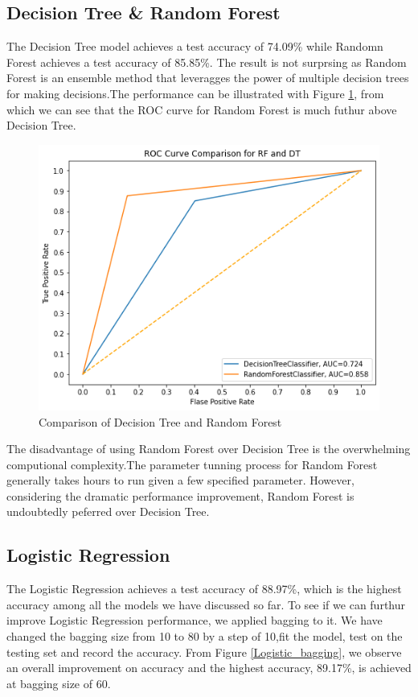 \documentclass[10pt,twocolumn,letterpaper]{article}
\begin{document}
	\subsection{Decision Tree \& Random Forest}
	The Decision Tree model achieves a test accuracy of 74.09\% while Randomn Forest achieves a test accuracy of 85.85\%. The result is not surprsing as Random Forest is an ensemble method that leveragges the power of multiple decision trees for making decisions.The performance can be illustrated with Figure \ref{ROC_RF_DT}, from which we can see that the ROC curve for Random Forest is much futhur above Decision Tree. 
	\begin{figure}[H]
		\includegraphics[width=\columnwidth]{ROC_RF_DT}
		\caption{Comparison of Decision Tree and Random Forest}\label{ROC_RF_DT}
	\end{figure} 
	The disadvantage of using Random Forest over Decision Tree is the overwhelming computional complexity.The parameter tunning process for Random Forest generally takes hours to run given a few specified parameter. However, considering the dramatic performance improvement, Random Forest is undoubtedly peferred over Decision Tree.
	\subsection{Logistic Regression}
	The Logistic Regression achieves a test accuracy of 88.97\%, which is the highest accuracy among all the models we have discussed so far. To see if we can furthur improve Logistic Regression performance, we applied bagging to it. We have changed the bagging size from 10 to 80 by a step of 10,fit the model, test on the testing set and record the accuracy. From Figure \ref{Logistic_bagging}, we observe an overall improvement on accuracy and the highest accuracy, 89.17\%, is achieved at bagging size of 60.
\end{document}
